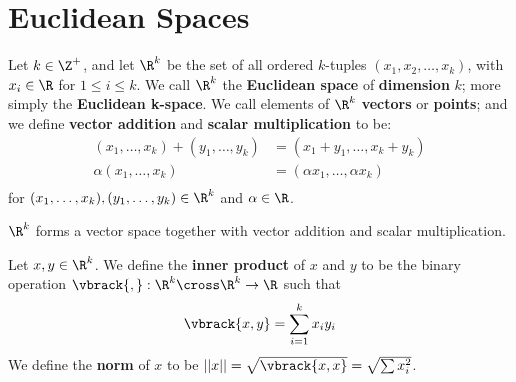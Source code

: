 
\section{Euclidean Spaces}

\begin{definition}
    Let $k \in \Z^+$, and let $\R^k$ be the set of all ordered  $k$-tuples  
    $(x_1,x_2, \dots, x_k)$, with $x_i \in \R$ for  $1 \leq i \leq k$. We call $\R^k$ 
    the \textbf{Euclidean space} of \textbf{dimension} $k$; more simply  the \textbf{Euclidean k-space}.
    We call elements of  $\R^k$  \textbf{vectors} or \textbf{points}; and we define 
    \textbf{vector addition} and \textbf{scalar multiplication} to be:
        \begin{align*}
            (x_1, \dots, x_k)+(y_1, \dots, y_k) &= (x_1+y_1, \dots, x_k+y_k) \\
            \alpha(x_1, \dots, x_k) &= (\alpha x_1, \dots, \alpha x_k) \\
        \end{align*}
        for $(x_1, \dots, x_k),(y_1, \dots, y_k) \in \R^k$ and $\alpha \in \R$.
\end{definition}

\begin{theorem}\label{1.5.1}
    $\R^k$ forms a vector space together with vector addition and scalar multiplication.
\end{theorem}

\begin{definition}
    Let $x,y \in \R^k$. We define the \textbf{inner product} of  $x$ and  $y$ to be the 
    binary operation $\vbrack{,}: \R^k \cross \R^k \rightarrow \R$ such that
        \begin{equation*}
            \vbrack{x,y}=\sum_{i=1}^{k}{x_iy_i}
        \end{equation*}
        We define the  \textbf{norm} of  $x$ to be  $||x||=\sqrt{\vbrack{x,x}}=\sqrt{\sum{x_i^2}}$.
\end{definition}

